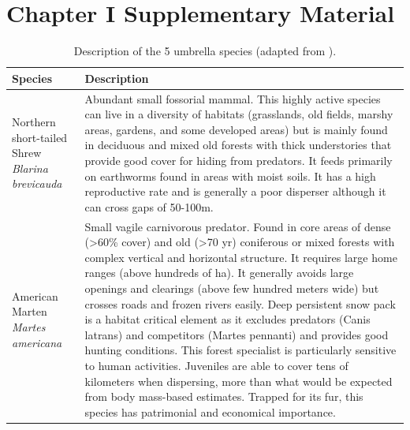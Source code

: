 
\chapter*{\textbf{Chapter I Supplementary Material \\ \hspace{1em}}}

\setcounter{chapter}{3}
\setcounter{table}{0}
\setcounter{figure}{0}


\begin{longtable}[c]{|p{5cm}|p{11cm}|}
\caption{Description of the 5 umbrella species (adapted from \cite{rayfield_priorisation_2018}).}
\label{tab:species} \\
\hline
\hline
\textbf{Species} & \textbf{Description} \\ \hline
Northern short-tailed Shrew \newline \textit{Blarina brevicauda} & Abundant small fossorial mammal. This highly active species can live in a diversity of habitats (grasslands, old fields, marshy areas, gardens, and some developed areas) but is mainly found in deciduous and mixed old forests with thick understories that provide good cover for hiding from predators. It feeds primarily on earthworms found in areas with moist soils. It has a high reproductive rate and is generally a poor disperser although it can cross gaps of 50-100m. \\ \hline
American Marten \newline \textit{Martes americana} & Small vagile carnivorous predator. Found in core areas of dense (\textgreater{}60\% cover) and old (\textgreater{}70 yr) coniferous or mixed forests with complex vertical and horizontal structure. It requires large home ranges (above hundreds of ha). It generally avoids large openings and clearings (above few hundred meters wide) but crosses roads and frozen rivers easily. Deep persistent snow pack is a habitat critical element as it excludes predators (Canis latrans) and competitors (Martes pennanti) and provides good hunting conditions. This forest specialist is particularly sensitive to human activities. Juveniles are able to cover tens of kilometers when dispersing, more than what would be expected from body mass-based estimates. Trapped for its fur, this species has patrimonial and economical importance. \\ \hline

\end{longtable}
